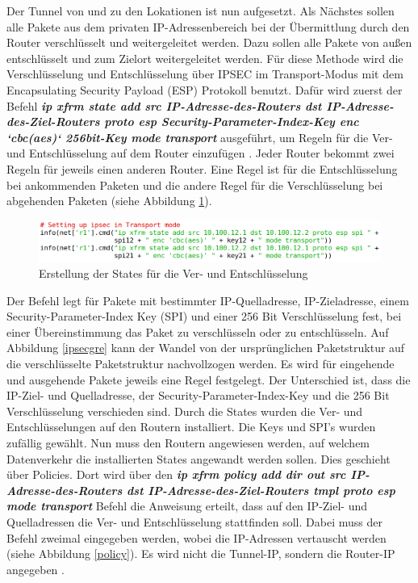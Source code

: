 \documentclass[fontsize=12pt,paper=a4,open=any,parskip=half,
  twoside=false,toc=listof,toc=bibliography,fleqn,leqno,
  captions=nooneline,captions=tableabove,british]{scrbook}
\begin{document}
Der Tunnel von und zu den Lokationen ist nun aufgesetzt. Als Nächstes sollen alle Pakete aus dem privaten IP-Adressenbereich bei der Übermittlung durch den Router verschlüsselt und weitergeleitet werden. Dazu sollen alle Pakete von außen entschlüsselt und zum Zielort weitergeleitet werden. Für diese Methode wird die Verschlüsselung und Entschlüsselung über IPSEC im Transport-Modus mit dem Encapsulating Security Payload (ESP) Protokoll benutzt. Dafür wird zuerst der Befehl \textit{\textbf{ip xfrm state add src IP-Adresse-des-Routers dst IP-Adresse-des-Ziel-Routers proto esp Security-Parameter-Index-Key enc ‘cbc(aes)‘ 256bit-Key mode transport}} ausgeführt, um Regeln für die Ver- und Entschlüsselung auf dem Router einzufügen \cite{esp}. Jeder Router bekommt zwei Regeln für jeweils einen anderen Router. Eine Regel ist für die Entschlüsselung bei ankommenden Paketen und die andere Regel für die Verschlüsselung bei abgehenden Paketen (siehe Abbildung \ref{state}).

\begin{figure}[H]
 \centering
 \includegraphics[width=1.0\textwidth]{Bilder/state}
 \captionsetup{justification=centering,margin=2cm}
 \caption{Erstellung der States für die Ver- und Entschlüsselung}
 \label{state}
\end{figure}

Der Befehl legt für Pakete mit bestimmter IP-Quelladresse, IP-Zieladresse, einem Security-Parameter-Index Key (SPI) und einer 256 Bit Verschlüsselung fest, bei einer Übereinstimmung das Paket zu verschlüsseln oder zu entschlüsseln. Auf Abbildung \ref{ipsecgre} kann der Wandel von der ursprünglichen Paketstruktur auf die verschlüsselte Paketstruktur nachvollzogen werden. Es wird für eingehende und ausgehende Pakete jeweils eine Regel festgelegt. Der Unterschied ist, dass die IP-Ziel- und Quelladresse, der Security-Parameter-Index-Key und die 256 Bit Verschlüsselung verschieden sind. Durch die States wurden die Ver- und Entschlüsselungen auf den Routern installiert. Die Keys und SPI’s wurden zufällig gewählt. Nun muss den Routern angewiesen werden, auf welchem Datenverkehr die installierten States angewandt werden sollen. Dies geschieht über Policies. Dort wird über den \textit{\textbf{ip xfrm policy add dir out src IP-Adresse-des-Routers dst IP-Adresse-des-Ziel-Routers tmpl proto esp mode transport}} Befehl die Anweisung erteilt, dass auf den IP-Ziel- und Quelladressen die Ver- und Entschlüsselung stattfinden soll. Dabei muss der Befehl zweimal eingegeben werden, wobei die IP-Adressen vertauscht werden (siehe Abbildung \ref{policy}). Es wird nicht die Tunnel-IP, sondern die Router-IP angegeben \cite{xfrm}.
\end{document}

